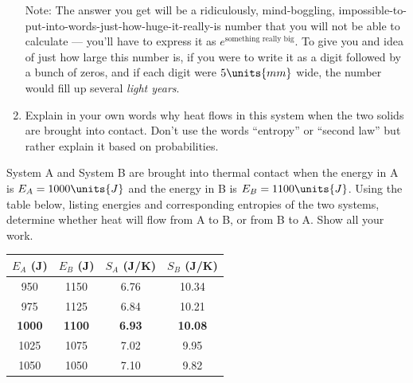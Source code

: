 \begin{problem}
\begin{enumerate}
Note:  The answer you get will be a ridiculously, mind-boggling,
impossible-to-put-into-words-just-how-huge-it-really-is number
that you will not be able to calculate ---  you'll have to express it as
$e^\text{something really big}$.  To give you and idea of just how
large this number is, if you were to write it as a digit followed by a
bunch of zeros, and if each digit were $5\units{mm}$ wide, the number
would fill up several {\em light years}.

\item Explain in your own words why heat flows in this system when the
two solids are brought into contact.  Don't use the words ``entropy''
or ``second law'' but rather explain it based on probabilities.

\end{enumerate}
\label{prob:energy_transferB}
\end{problem}


\newpage


\newpage
\begin{problem}
System A and System B are brought into thermal contact when the energy in
A is $E_A= 1000\units{J}$ and the energy in B is $E_B=1100\units{J}$.
Using the table below, listing energies and corresponding entropies of
the two systems, determine whether heat will flow from A to B, or 
from B to A.  Show all your work.

\begin{center}
{\large
\renewcommand{\arraystretch}{1.8}
\begin{tabular}{|c|c|c|c|} \hline
$E_A$ (J) & $E_B$ (J)  & $S_A$ (J/K) & $S_B$ (J/K)
     \\ \hline \hline
    950   &       1150   &     6.76     &    10.34     \\ \hline
    975   &       1125   &     6.84     &    10.21     \\ \hline
{\bf 1000}&  {\bf 1100}  & {\bf 6.93}   & {\bf   10.08} \\ \hline
    1025   &      1075   &     7.02     &     9.95     \\ \hline
    1050   &      1050   &     7.10     &     9.82     \\ \hline
\end{tabular}
\renewcommand{\arraystretch}{1.0}
}
\end{center}
\end{problem}


